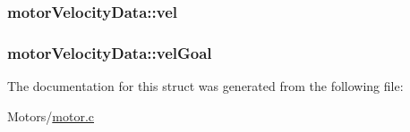 \label{structmotor_velocity_data_a37ae264555f7fddbd5bf4717114bfcd0}
\hypertarget{structmotor_velocity_data_ad9d4f17a6cc076215d4a6f7df49e3e0f}{
\subsubsection[{vel}]{ {\bf motorVelocityData::vel}}}
\label{structmotor_velocity_data_ad9d4f17a6cc076215d4a6f7df49e3e0f}
\hypertarget{structmotor_velocity_data_a4e5f814db8101365b6d3f53f147dc7b0}{
\subsubsection[{velGoal}]{ {\bf motorVelocityData::velGoal}}}
\label{structmotor_velocity_data_a4e5f814db8101365b6d3f53f147dc7b0}


The documentation for this struct was generated from the following file:\begin{DoxyCompactItemize}
\item 
Motors/\hyperlink{motor_8c}{motor.c}\end{DoxyCompactItemize}
